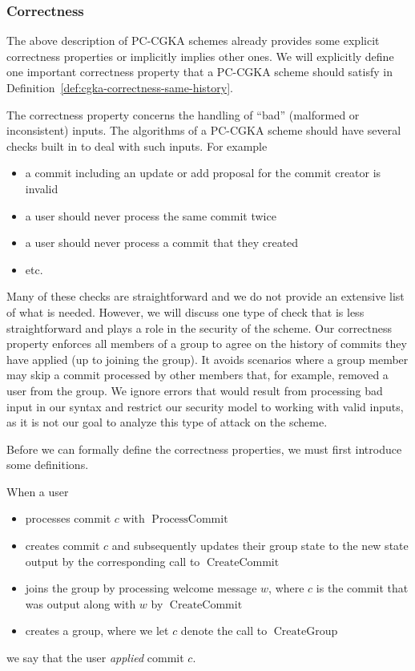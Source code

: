 \subsubsection{Correctness}

The above description of PC-CGKA schemes already provides some explicit correctness properties or implicitly implies other ones. We will explicitly define one important correctness property that a PC-CGKA scheme should satisfy in Definition~\vref{def:cgka-correctness-same-history}. 

The correctness property concerns the handling of ``bad'' (malformed or inconsistent) inputs. The algorithms of a PC-CGKA scheme should have several checks built in to deal with such inputs. For example
\begin{itemize}
	\item a commit including an update or add proposal for the commit creator is invalid
	\item a user should never process the same commit twice
	\item a user should never process a commit that they created
	\item etc.
\end{itemize}
Many of these checks are straightforward and we do not provide an extensive list of what is needed. However, we will discuss one type of check that is less straightforward and plays a role in the security of the scheme. Our correctness property enforces all members of a group to agree on the history of commits they have applied (up to joining the group). It avoids scenarios where a group member may skip a commit processed by other members that, for example, removed a user from the group. We ignore errors that would result from processing bad input in our syntax and restrict our security model to working with valid inputs, as it is not our goal to analyze this type of attack on the scheme.

Before we can formally define the correctness properties, we must first introduce some definitions.

\begin{definition}
	When a user
	\begin{itemize}
		\item processes commit $c$ with $\operatorname{ProcessCommit}$
		\item creates commit $c$ and subsequently updates their group state to the new state output by the corresponding call to $\operatorname{CreateCommit}$
		\item joins the group by processing welcome message $w$, where $c$ is the commit that was output along with $w$ by $\operatorname{CreateCommit}$
		\item creates a group, where we let $c$ denote the call to $\operatorname{CreateGroup}$
	\end{itemize}
	we say that the user \emph{applied} commit $c$.
\end{definition}

